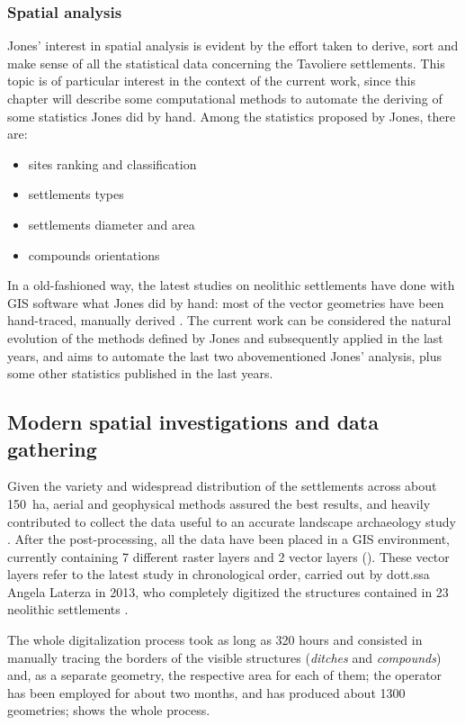             \subsubsection{Spatial analysis}
                Jones' interest in spatial analysis is evident by the effort taken to derive, sort and make sense of all the statistical data concerning the Tavoliere settlements. This topic is of particular interest in the context of the current work, since this chapter will describe some computational methods to automate the deriving of some statistics Jones did by hand. Among the statistics proposed by Jones, there are:
                \begin{itemize}
                    \item sites ranking and classification
                    \item settlements types
                    \item settlements diameter and area
                    \item compounds orientations
                \end{itemize}
                In a old-fashioned way, the latest studies on neolithic settlements have done with GIS software what Jones did by hand: most of the vector geometries have been hand-traced, manually derived \cite{laterza}.
                The current work can be considered the natural evolution of the methods defined by Jones and subsequently applied in the last years, and aims to automate the last two abovementioned Jones' analysis, plus some other statistics published in the last years.

        \subsection{Modern spatial investigations and data gathering}
            Given the variety and widespread distribution of the settlements across about \SI{150}{\hectare}, aerial and geophysical methods assured the best results, and heavily contributed to collect the data useful to an accurate landscape archaeology study \cite[pp.~45--48]{remote-ciminale}. After the post-processing, all the data have been placed in a GIS environment, currently containing 7 different raster layers and 2 vector layers (). These vector layers refer to the latest study in chronological order, carried out by dott.ssa Angela Laterza in 2013, who completely digitized the structures contained in 23 neolithic settlements \cite{laterza}. 
            
            The whole digitalization process took as long as 320 hours and consisted in manually tracing the borders of the visible structures (\emph{ditches} and \emph{compounds}) and, as a separate geometry, the respective area for each of them; the operator has been employed for about two months, and has produced about 1300 geometries;  shows the whole process.

